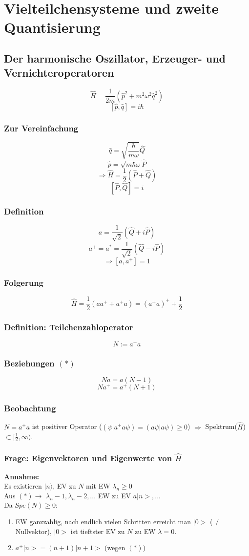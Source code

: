 \documentclass[twoside,a4paper]{scrartcl}
\renewcommand{\1}{\mathds{1}}
\newcommand{\Ra}{\Rightarrow}
\newcommand{\ra}{\rightarrow}
\renewcommand{\l}{\lambda}
\begin{document}
\section{Vielteilchensysteme und zweite Quantisierung} 
\subsection{Der harmonische Oszillator, Erzeuger- und Vernichteroperatoren} 
$$\hat H=\frac{1}{2m}(\hat p^2+m^2\omega^2\hat q^2)$$
$$[\hat p, \hat q]=i\hbar$$
\subsubsection*{Zur Vereinfachung} 
$$\hat q=\sqrt{\frac{\hbar}{m\omega}}\hat Q$$
$$\hat p=\sqrt{m\hbar\omega}\hat P$$
$$\Ra \hat H=\frac{1}{2}(\hat P+ \hat Q)$$
$$[\hat P, \hat Q]=i$$
\subsubsection*{Definition} 
$$a=\frac{1}{\sqrt{2}}(\hat Q+i\hat P)$$
$$a^+=a^*=\frac{1}{\sqrt{2}}(\hat Q-i\hat P)$$
$$\Ra [a,a^+]=1$$
\subsubsection*{Folgerung} 
$$\hat H=\frac{1}{2}(aa^++a^+a)=(a^+a)^++\frac{1}{2}$$
\subsubsection*{Definition: Teilchenzahloperator} 
$$N:=a^+a$$
\subsubsection*{Beziehungen $(*)$} 
$$Na=a(N-1)$$
$$Na^+=a^+(N+1)$$
\subsubsection*{Beobachtung} 
$N=a^+a$ ist positiver Operator ($(\psi|a^+a\psi)=(a\psi|a\psi)\geq0$) $\Ra$ Spektrum($\hat H$) $\subset [\frac{1}{2},\infty)$.
\subsubsection*{Frage: Eigenvektoren und Eigenwerte von $\hat H$} 
\textbf{Annahme:}\\
Es existieren $|n\rangle$, EV zu $N$ mit EW $\l_n\geq 0$\\
Aus $(*) \ra$ $\l_n-1,\l_n-2,...$ EW zu EV $a|n>,...$\\
Da $Spe(N)\geq 0$:
\begin{enumerate}
\item EW ganzzahlig, nach endlich vielen Schritten erreicht man $|0>$ ($\neq$ Nullvektor), $|0>$ ist tieftster EV zu $N$ zu EW $\l=0$.
\item $a^+|n>=(n+1)|n+1>$ (wegen $(*)$)
\end{enumerate}
\end{document}
